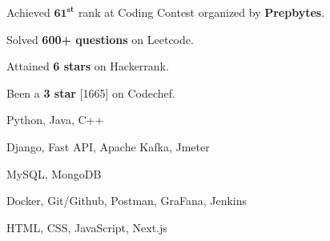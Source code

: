 

\begin{itemize}
\item Achieved $\textbf{61}^\textbf{st}$ rank at Coding Contest organized by \textbf{Prepbytes}.
\item {\small Solved \textbf{600+ questions} on Leetcode.
\item Attained \textbf{6 stars} on Hackerrank.
\item Been a \textbf{3 star} [1665] on Codechef.}
\end{itemize}

\begin{itemize}
    {\normalsize \item Python, Java, C++}
\end{itemize}
\begin{itemize}
    {\normalsize \item Django, Fast API, Apache Kafka, Jmeter}
\end{itemize}
\begin{itemize}
    {\normalsize \item MySQL, MongoDB}
\end{itemize}

\begin{itemize}
    {\normalsize \item Docker, Git/Github, Postman, GraFana, Jenkins}
\end{itemize}
\begin{itemize}
    {\normalsize \item HTML, CSS, JavaScript, Next.js}
\end{itemize}



